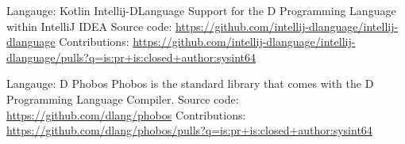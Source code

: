 
\cventry
{Langauge: Kotlin}
{Intellij-DLanguage}
{}
{}
{
Support for the D Programming Language within IntelliJ IDEA\linebreak
Source code: \url{https://github.com/intellij-dlanguage/intellij-dlanguage}\linebreak
Contributions: \url{https://github.com/intellij-dlanguage/intellij-dlanguage/pulls?q=is:pr+is:closed+author:sysint64}
}

\cventry
{Langauge: D}
{Phobos}
{}
{}
{
Phobos is the standard library that comes with the D Programming Language Compiler.\linebreak
Source code: \url{https://github.com/dlang/phobos}\linebreak
Contributions: \url{https://github.com/dlang/phobos/pulls?q=is:pr+is:closed+author:sysint64}
}



